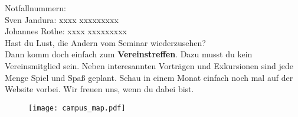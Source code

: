 
Notfallnummern: \\
Sven Jandura: xxxx xxxxxxxxx \\
Johannes Rothe: xxxx xxxxxxxxx \\

\large Hast du Lust, die Andern vom Seminar wiederzusehen?\\
\normalsize Dann komm doch einfach zum \textbf{Vereinstreffen}. Dazu musst du kein Vereinsmitglied sein. Neben interesannten Vorträgen und Exkursionen sind jede Menge Spiel und Spaß geplant. Schau in einem Monat einfach noch mal auf der Website vorbei. Wir freuen uns, wenn du dabei bist.

\begin{figure}[!h]
\texttt{[image: campus\_map.pdf]}
\end{figure}
